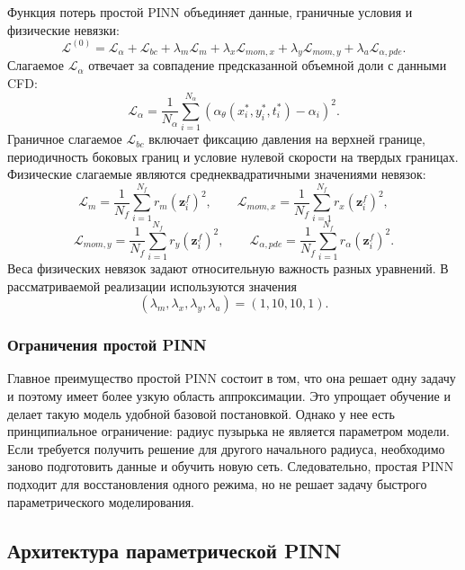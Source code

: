 \documentclass[12pt,a4paper]{article}
\begin{document}
Функция потерь простой PINN объединяет данные, граничные условия и физические
невязки:
\begin{equation}
    \mathcal{L}^{(0)}
    =
    \mathcal{L}_{\alpha}
    +
    \mathcal{L}_{bc}
    +
    \lambda_m\mathcal{L}_{m}
    +
    \lambda_x\mathcal{L}_{mom,x}
    +
    \lambda_y\mathcal{L}_{mom,y}
    +
    \lambda_a\mathcal{L}_{\alpha,pde}.
    \label{eq:chapter2_loss_simple}
\end{equation}
Слагаемое \(\mathcal{L}_{\alpha}\) отвечает за совпадение предсказанной
объемной доли с данными CFD:
\begin{equation}
    \mathcal{L}_{\alpha}
    =
    \frac{1}{N_\alpha}
    \sum_{i=1}^{N_\alpha}
    \left(
        \alpha_\theta(x_i^*,y_i^*,t_i^*)-\alpha_i
    \right)^2.
\end{equation}
Граничное слагаемое \(\mathcal{L}_{bc}\) включает фиксацию давления на верхней
границе, периодичность боковых границ и условие нулевой скорости на твердых
границах. Физические слагаемые являются среднеквадратичными значениями
невязок:
\[
    \mathcal{L}_{m}
    =
    \frac{1}{N_f}\sum_{i=1}^{N_f}r_m(\mathbf{z}_i^f)^2,
    \qquad
    \mathcal{L}_{mom,x}
    =
    \frac{1}{N_f}\sum_{i=1}^{N_f}r_x(\mathbf{z}_i^f)^2,
\]
\[
    \mathcal{L}_{mom,y}
    =
    \frac{1}{N_f}\sum_{i=1}^{N_f}r_y(\mathbf{z}_i^f)^2,
    \qquad
    \mathcal{L}_{\alpha,pde}
    =
    \frac{1}{N_f}\sum_{i=1}^{N_f}r_\alpha(\mathbf{z}_i^f)^2.
\]
Веса физических невязок задают относительную важность разных уравнений. В
рассматриваемой реализации используются значения
\[
    (\lambda_m,\lambda_x,\lambda_y,\lambda_a)=(1,10,10,1).
\]

\subsubsection{Ограничения простой PINN}

Главное преимущество простой PINN состоит в том, что она решает одну задачу и
поэтому имеет более узкую область аппроксимации. Это упрощает обучение и делает
такую модель удобной базовой постановкой. Однако у нее есть принципиальное
ограничение: радиус пузырька не является параметром модели. Если требуется
получить решение для другого начального радиуса, необходимо заново подготовить
данные и обучить новую сеть. Следовательно, простая PINN подходит для
восстановления одного режима, но не решает задачу быстрого параметрического
моделирования.

\subsection{Архитектура параметрической PINN}
\end{document}
